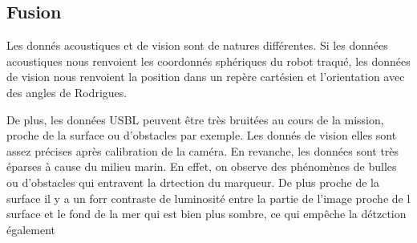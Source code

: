 \documentclass[twocolumn]{article}
\begin{document}
\subsection{Fusion}
Les donnés acoustiques et de vision sont de natures différentes. Si les données acoustiques nous renvoient les coordonnés sphériques du robot traqué, les données de vision nous renvoient la position dans un repère cartésien et l'orientation avec des angles de Rodrigues. 

De plus, les données USBL peuvent être très bruitées au cours de la mission, proche de la surface ou d'obstacles par exemple. Les donnés de vision elles sont assez précises après calibration de la caméra. En revanche, les données sont très éparses à cause du milieu marin. En effet, on observe des phénomènes de bulles ou d'obstacles qui entravent la drtection du marqueur. De plus proche de la surface il y a un forr contraste de luminosité entre la partie de l'image proche de l surface et le fond de la mer qui est bien plus sombre, ce qui empêche la détzction également
\end{document}
